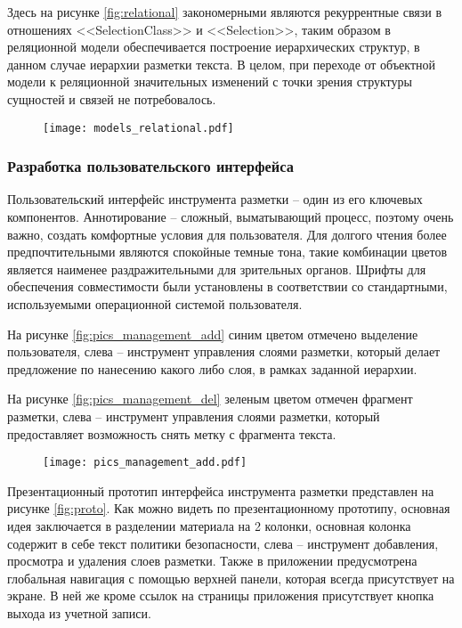 \documentclass[../main]{subfiles}
\begin{document}
Здесь на рисунке \ref{fig:relational} закономерными являются рекуррентные связи в отношениях <<SelectionClass>> и <<Selection>>, таким образом в реляционной модели обеспечивается построение иерархических структур, в данном случае иерархии разметки текста. В целом, при переходе от объектной модели к реляционной значительных изменений с точки зрения структуры сущностей и связей не потребовалось.

\begin{figure}[H]
    \centering
    {\texttt{[image: models\_relational.pdf]}}
    \vspace{-\baselineskip}
\end{figure}

\subsubsection{Разработка пользовательского интерфейса}
\label{sec:ui}

Пользовательский интерфейс инструмента разметки -- один из его ключевых компонентов. Аннотирование -- сложный, выматывающий процесс, поэтому очень важно, создать комфортные условия для пользователя. Для долгого чтения более предпочтительными являются спокойные темные тона, такие комбинации цветов является наименее раздражительными для зрительных органов. Шрифты для обеспечения совместимости были установлены в соответствии со стандартными, используемыми операционной системой пользователя.  

На рисунке \ref{fig:pics_management_add} синим цветом отмечено выделение пользователя, слева -- инструмент управления слоями разметки, который делает предложение по нанесению какого либо слоя, в рамках заданной иерархии.

На рисунке \ref{fig:pics_management_del} зеленым цветом отмечен фрагмент разметки, слева -- инструмент управления слоями разметки, который предоставляет возможность снять метку с фрагмента текста.

\begin{figure}[H]
    \centering
    {\texttt{[image: pics\_management\_add.pdf]}}
    \vspace{-\baselineskip}
\end{figure}

Презентационный прототип интерфейса инструмента разметки представлен на рисунке \ref{fig:proto}. Как можно видеть по презентационному прототипу, основная идея заключается в разделении материала на 2 колонки, основная колонка содержит в себе текст политики безопасности, слева -- инструмент добавления, просмотра и удаления слоев разметки. Также в приложении предусмотрена глобальная навигация с помощью верхней панели, которая всегда присутствует на экране. В ней же кроме ссылок на страницы приложения присутствует кнопка выхода из учетной записи.
\end{document}
